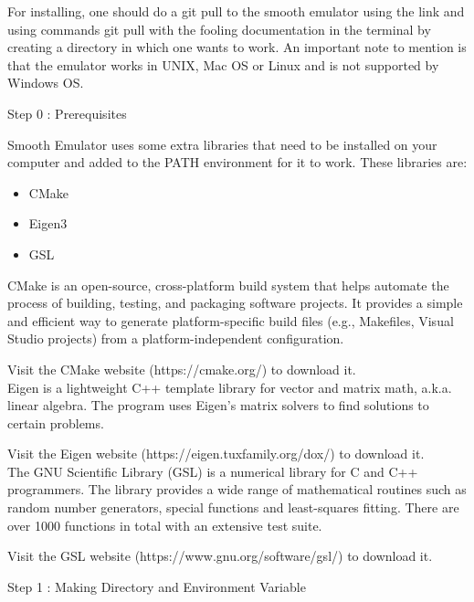 \documentclass[12pt]{article}
\numberwithin{equation}{section}
\numberwithin{figure}{section}
\begin{document}
For installing, one should do a git pull to the smooth emulator using the link and using commands git pull with the fooling documentation in the terminal by creating a directory in which one wants to work. An important note to mention is that the emulator works in UNIX, Mac OS or Linux and is not supported by Windows OS.

\begin{description}
\item[Step 0 : Prerequisites] 
\end{description}

Smooth Emulator uses some extra libraries that need to be installed on your computer and added to the PATH environment for it to work. These libraries are:

\begin{itemize}
    \item CMake
    \item Eigen3
    \item GSL
\end{itemize}

CMake is an open-source, cross-platform build system that helps automate the process of building, testing, and packaging software projects. It provides a simple and efficient way to generate platform-specific build files (e.g., Makefiles, Visual Studio projects) from a platform-independent configuration.

Visit the CMake website (https://cmake.org/) to download it.\\

Eigen is a lightweight C++ template library for vector and matrix math, a.k.a. linear algebra. The program uses Eigen's matrix solvers to find solutions to certain problems.

Visit the Eigen website (https://eigen.tuxfamily.org/dox/) to download it.\\

The GNU Scientific Library (GSL) is a numerical library for C and C++ programmers. The library provides a wide range of mathematical routines such as random number generators, special functions and least-squares fitting. There are over 1000 functions in total with an extensive test suite.

Visit the GSL website (https://www.gnu.org/software/gsl/) to download it.\\

\begin{description}
\item[Step 1 : Making Directory and Environment Variable]
\end{description}
\end{document}
